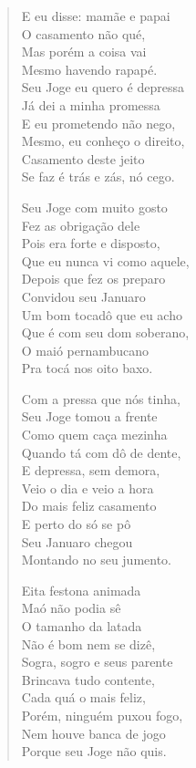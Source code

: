 \begin{verse}
E eu disse: mamãe e papai\\
O casamento não qué,\\
Mas porém a coisa vai\\
Mesmo havendo rapapé.\\
Seu Joge eu quero é depressa\\
Já dei a minha promessa\\
E eu prometendo não nego,\\
Mesmo, eu conheço o direito,\\
Casamento deste jeito\\
Se faz é trás e zás, nó cego.

Seu Joge com muito gosto\\
Fez as obrigação dele\\
Pois era forte e disposto,\\
Que eu nunca vi como aquele,\\
Depois que fez os preparo\\
Convidou seu Januaro\\
Um bom tocadô que eu acho\\
Que é com seu dom soberano,\\
O maió pernambucano\\
Pra tocá nos oito baxo.

Com a pressa que nós tinha,\\
Seu Joge tomou a frente\\
Como quem caça mezinha\\
Quando tá com dô de dente,\\
E depressa, sem demora,\\
Veio o dia e veio a hora\\
Do mais feliz casamento\\
E perto do só se pô\\
Seu Januaro chegou\\
Montando no seu jumento.

Eita festona animada\\
Maó não podia sê\\
O tamanho da latada\\
Não é bom nem se dizê,\\
Sogra, sogro e seus parente\\
Brincava tudo contente,\\
Cada quá o mais feliz,\\
Porém, ninguém puxou fogo,\\
Nem houve banca de jogo\\
Porque seu Joge não quis.


\end{verse}
